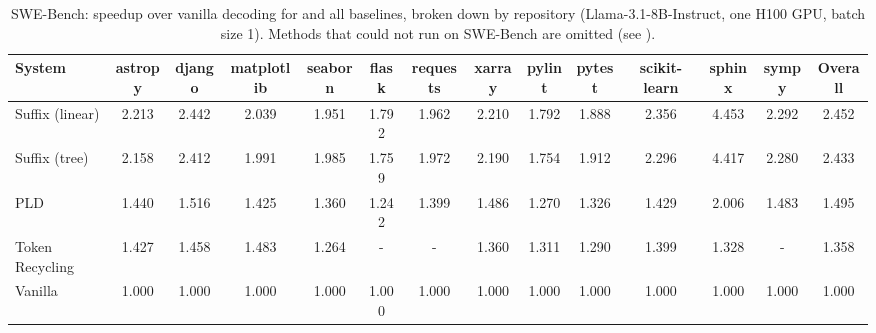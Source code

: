 \begin{table}[htbp]
\centering
\caption{SWE-Bench: speedup over vanilla decoding for \SuffixDecoding and all baselines, broken down by repository (Llama-3.1-8B-Instruct, one H100 GPU, batch size 1). Methods that could not run on SWE-Bench are omitted (see ).}
\label{suffixdecoding:tab:swe-speedup}
\small
\begin{adjustbox}{width=\linewidth}
\begin{tabular}{lccccccccccccc}
\toprule
\textbf{System} & astropy & django & matplotlib & seaborn & flask & requests & xarray & pylint & pytest & scikit-learn & sphinx & sympy & \textbf{Overall} \\
\midrule
Suffix (linear) & 2.213 & 2.442 & 2.039 & 1.951 & 1.792 & 1.962 & 2.210 & 1.792 & 1.888 & 2.356 & 4.453 & 2.292 & 2.452 \\
Suffix (tree) & 2.158 & 2.412 & 1.991 & 1.985 & 1.759 & 1.972 & 2.190 & 1.754 & 1.912 & 2.296 & 4.417 & 2.280 & 2.433 \\
PLD & 1.440 & 1.516 & 1.425 & 1.360 & 1.242 & 1.399 & 1.486 & 1.270 & 1.326 & 1.429 & 2.006 & 1.483 & 1.495 \\
Token Recycling & 1.427 & 1.458 & 1.483 & 1.264 & - & - & 1.360 & 1.311 & 1.290 & 1.399 & 1.328 & - & 1.358 \\
Vanilla & 1.000 & 1.000 & 1.000 & 1.000 & 1.000 & 1.000 & 1.000 & 1.000 & 1.000 & 1.000 & 1.000 & 1.000 & 1.000 \\
\bottomrule
\end{tabular}
\end{adjustbox}
\end{table}

